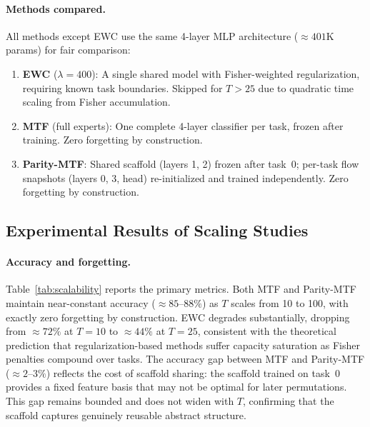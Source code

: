 \documentclass{article}
\begin{document}
\paragraph{Methods compared.}
All methods except EWC use the same 4-layer MLP architecture ($\approx\!401$K params) for fair comparison:
\begin{enumerate}
    \item \textbf{EWC} ($\lambda = 400$): A single shared model with Fisher-weighted regularization, requiring known task boundaries. Skipped for $T > 25$ due to quadratic time scaling from Fisher accumulation.
    \item \textbf{MTF} (full experts): One complete 4-layer classifier per task, frozen after training. Zero forgetting by construction.
    \item \textbf{Parity-MTF}: Shared scaffold (layers 1, 2) frozen after task~0; per-task flow snapshots (layers 0, 3, head) re-initialized and trained independently. Zero forgetting by construction.
\end{enumerate}

\subsection{Experimental Results of Scaling Studies}

\paragraph{Accuracy and forgetting.}
Table~\ref{tab:scalability} reports the primary metrics.
Both MTF and Parity-MTF maintain near-constant accuracy ($\approx\! 85$--$88\%$) as $T$ scales from 10 to 100, with exactly zero forgetting by construction.
EWC degrades substantially, dropping from $\approx\!72\%$ at $T=10$ to $\approx\!44\%$ at $T=25$, consistent with the theoretical prediction that regularization-based methods suffer capacity saturation as Fisher penalties compound over tasks.
The accuracy gap between MTF and Parity-MTF ($\approx\!2$--$3\%$) reflects the cost of scaffold sharing: the scaffold trained on task~0 provides a fixed feature basis that may not be optimal for later permutations.
This gap remains bounded and does not widen with $T$, confirming that the scaffold captures genuinely reusable abstract structure.
\end{document}
